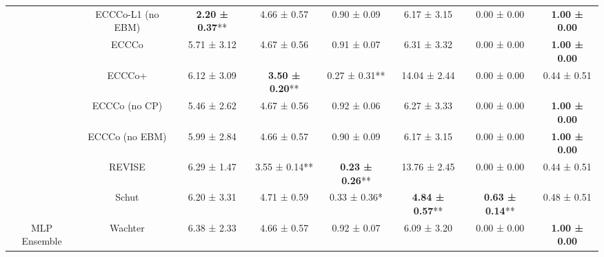 \begin{table}
{\begin{tabular}[t]{cccccccc}
 & ECCCo-L1 (no EBM) & \textbf{2.20 ± 0.37}** & 4.66 ± 0.57\hphantom{*}\hphantom{*} & 0.90 ± 0.09\hphantom{*}\hphantom{*} & 6.17 ± 3.15\hphantom{*}\hphantom{*} & 0.00 ± 0.00\hphantom{*}\hphantom{*} & \textbf{1.00 ± 0.00}\hphantom{*}\hphantom{*}\\

 & ECCCo & 5.71 ± 3.12\hphantom{*}\hphantom{*} & 4.67 ± 0.56\hphantom{*}\hphantom{*} & 0.91 ± 0.07\hphantom{*}\hphantom{*} & 6.31 ± 3.32\hphantom{*}\hphantom{*} & 0.00 ± 0.00\hphantom{*}\hphantom{*} & \textbf{1.00 ± 0.00}\hphantom{*}\hphantom{*}\\

 & ECCCo+ & 6.12 ± 3.09\hphantom{*}\hphantom{*} & \textbf{3.50 ± 0.20}** & 0.27 ± 0.31** & 14.04 ± 2.44\hphantom{*}\hphantom{*} & 0.00 ± 0.00\hphantom{*}\hphantom{*} & 0.44 ± 0.51\hphantom{*}\hphantom{*}\\

 & ECCCo (no CP) & 5.46 ± 2.62\hphantom{*}\hphantom{*} & 4.67 ± 0.56\hphantom{*}\hphantom{*} & 0.92 ± 0.06\hphantom{*}\hphantom{*} & 6.27 ± 3.33\hphantom{*}\hphantom{*} & 0.00 ± 0.00\hphantom{*}\hphantom{*} & \textbf{1.00 ± 0.00}\hphantom{*}\hphantom{*}\\

 & ECCCo (no EBM) & 5.99 ± 2.84\hphantom{*}\hphantom{*} & 4.66 ± 0.57\hphantom{*}\hphantom{*} & 0.90 ± 0.09\hphantom{*}\hphantom{*} & 6.17 ± 3.15\hphantom{*}\hphantom{*} & 0.00 ± 0.00\hphantom{*}\hphantom{*} & \textbf{1.00 ± 0.00}\hphantom{*}\hphantom{*}\\

 & REVISE & 6.29 ± 1.47\hphantom{*}\hphantom{*} & 3.55 ± 0.14** & \textbf{0.23 ± 0.26}** & 13.76 ± 2.45\hphantom{*}\hphantom{*} & 0.00 ± 0.00\hphantom{*}\hphantom{*} & 0.44 ± 0.51\hphantom{*}\hphantom{*}\\

 & Schut & 6.20 ± 3.31\hphantom{*}\hphantom{*} & 4.71 ± 0.59\hphantom{*}\hphantom{*} & 0.33 ± 0.36*\hphantom{*} & \textbf{4.84 ± 0.57}** & \textbf{0.63 ± 0.14}** & 0.48 ± 0.51\hphantom{*}\hphantom{*}\\

\multirow[t]{-10}{*}{\centering\arraybackslash MLP Ensemble} & Wachter & 6.38 ± 2.33\hphantom{*}\hphantom{*} & 4.66 ± 0.57\hphantom{*}\hphantom{*} & 0.92 ± 0.07\hphantom{*}\hphantom{*} & 6.09 ± 3.20\hphantom{*}\hphantom{*} & 0.00 ± 0.00\hphantom{*}\hphantom{*} & \textbf{1.00 ± 0.00}\hphantom{*}\hphantom{*}\\
\bottomrule
\end{tabular}}
\end{table}
